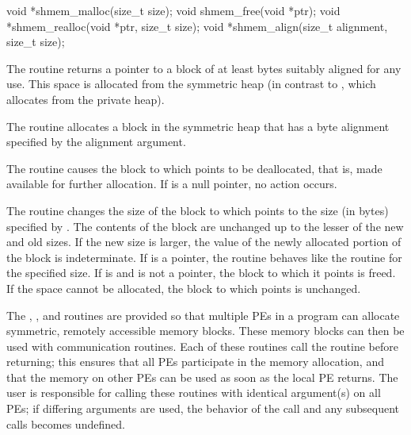 \synC
void *shmem_malloc(size_t size);
void shmem_free(void *ptr);
void *shmem_realloc(void *ptr, size_t size);
void *shmem_align(size_t alignment, size_t size);%

{
       The  routine returns a pointer to a block of at least 
       bytes suitably aligned for any use.  This space is allocated from the
       symmetric heap (in contrast to , which allocates from the
       private heap).

       The  routine allocates a block in the symmetric heap that
       has a byte alignment specified by the alignment argument.

       The  routine causes the block to which  points to be
       deallocated, that is, made available for further allocation.  If  is
       a null pointer, no action occurs. 
              
       The  routine changes the size of the block to which 
       points to the size (in bytes) specified by .  The contents of the
       block are unchanged up to the lesser of the new and old sizes. If the
       new size is larger, the value of the newly allocated portion of the
       block is indeterminate.  
       If  is a  pointer, the  routine behaves like the  routine for the specified size.  If  is  and  is not a  pointer, the block to which it points is freed. If the space cannot be allocated, the block to which  points is unchanged.

       The , , and  routines are provided  so that multiple \ac{PE}s in a program can allocate symmetric, remotely
       accessible memory blocks.  These memory blocks can then be used with
       \openshmem communication routines.  Each of these routines call the
        routine before returning; this ensures that all
       \ac{PE}s participate in the memory allocation, and that the memory on other
       \ac{PE}s can be used	as  soon as the local \ac{PE} returns.  The user is
       responsible for calling these routines with identical argument(s) on
       all \ac{PE}s; if differing  arguments are used, the behavior of the call and any subsequent \openshmem calls becomes undefined.
}
